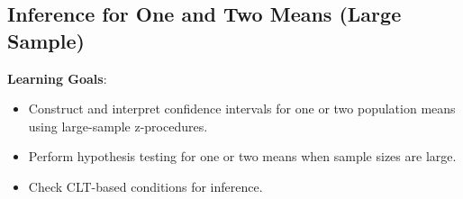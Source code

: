 \documentclass{article}
\begin{document}

\subsection{Inference for One and Two Means (Large Sample)}
\textbf{Learning Goals}:
\begin{itemize}
    \item Construct and interpret confidence intervals for one or two population means using large-sample z-procedures.
    \item Perform hypothesis testing for one or two means when sample sizes are large.
    \item Check CLT-based conditions for inference.
\end{itemize}
\end{document}
